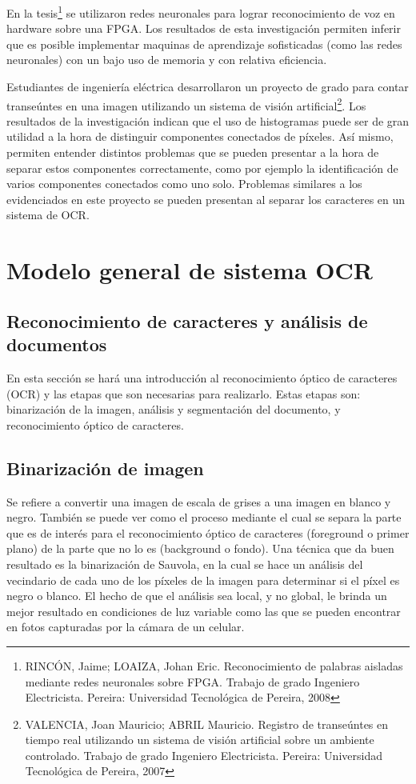 \documentclass[a4paper, 11pt, oneside]{report}
\begin{document}
En la tesis\footnote{RINCÓN, Jaime; LOAIZA, Johan Eric. Reconocimiento de palabras aisladas mediante redes neuronales sobre FPGA. Trabajo de grado Ingeniero Electricista. Pereira: Universidad Tecnológica de Pereira, 2008} se utilizaron redes neuronales para lograr reconocimiento de voz en hardware sobre una FPGA. Los resultados de esta investigación permiten inferir que es posible implementar maquinas de aprendizaje sofisticadas (como las redes neuronales) con un bajo uso de memoria y con relativa eficiencia.

Estudiantes de ingeniería eléctrica desarrollaron un proyecto de grado para contar transeúntes en una imagen utilizando un sistema de visión artificial\footnote{VALENCIA, Joan Mauricio; ABRIL Mauricio. Registro de transeúntes en tiempo real utilizando un sistema de visión artificial sobre un ambiente controlado. Trabajo de grado Ingeniero Electricista. Pereira: Universidad Tecnológica de Pereira, 2007}. Los resultados de la investigación indican que el uso de histogramas puede ser de gran utilidad a la hora de distinguir componentes conectados de píxeles. Así mismo, permiten entender distintos problemas que se pueden presentar a la hora de separar estos componentes correctamente, como por ejemplo la identificación de varios componentes conectados como uno solo. Problemas similares a los evidenciados en este proyecto se pueden presentan al separar los caracteres en un sistema de OCR.
    
\section{Modelo general de sistema OCR}

\subsection{Reconocimiento de caracteres y análisis de documentos}

En esta sección se hará una introducción al reconocimiento óptico de caracteres (OCR) y las etapas que son necesarias para realizarlo. Estas etapas son: binarización de la imagen, análisis y segmentación del documento, y reconocimiento óptico de caracteres.  

\subsection{Binarización de imagen}

Se refiere a convertir una imagen de escala de grises a una imagen en blanco y negro. También se puede ver como el proceso mediante el cual se separa la parte que es de interés para el reconocimiento óptico de caracteres (foreground o primer plano) de la parte que no lo es (background o fondo). Una técnica que da buen resultado es la binarización de Sauvola, en la cual se hace un análisis del vecindario de cada uno de los píxeles de la imagen para determinar si el píxel es negro o blanco. El hecho de que el análisis sea local, y no global, le brinda un mejor resultado en condiciones de luz variable como las que se pueden encontrar en fotos capturadas por la cámara de un celular.
\end{document}
